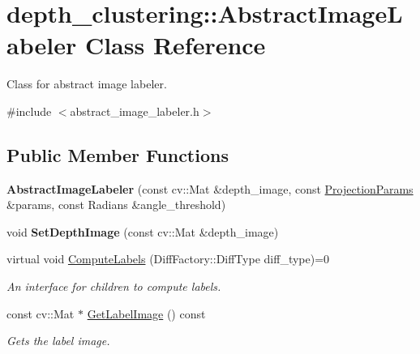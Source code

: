 \hypertarget{classdepth__clustering_1_1AbstractImageLabeler}{}\section{depth\+\_\+clustering\+:\+:Abstract\+Image\+Labeler Class Reference}
\label{classdepth__clustering_1_1AbstractImageLabeler}


Class for abstract image labeler.  




{\ttfamily \#include $<$abstract\+\_\+image\+\_\+labeler.\+h$>$}

\subsection*{Public Member Functions}
\begin{DoxyCompactItemize}
\item 
\mbox{\label{classdepth__clustering_1_1AbstractImageLabeler_ac01889e0a3d088cf7627809f4d8aab19}} 
{\bfseries Abstract\+Image\+Labeler} (const cv\+::\+Mat \&depth\+\_\+image, const \hyperlink{classdepth__clustering_1_1ProjectionParams}{Projection\+Params} \&params, const Radians \&angle\+\_\+threshold)
\item 
\mbox{\label{classdepth__clustering_1_1AbstractImageLabeler_a28e8e094c9a47a02a2ce9eabef9526e6}} 
void {\bfseries Set\+Depth\+Image} (const cv\+::\+Mat \&depth\+\_\+image)
\item 
\mbox{\label{classdepth__clustering_1_1AbstractImageLabeler_ac66f0554e1c988ab0bf413a2f17d3905}} 
virtual void \hyperlink{classdepth__clustering_1_1AbstractImageLabeler_ac66f0554e1c988ab0bf413a2f17d3905}{Compute\+Labels} (Diff\+Factory\+::\+Diff\+Type diff\+\_\+type)=0
\begin{DoxyCompactList}\small\item\em An interface for children to compute labels. \end{DoxyCompactList}\item 
const cv\+::\+Mat $\ast$ \hyperlink{classdepth__clustering_1_1AbstractImageLabeler_a7b2f8edf44f3ccb01fb71c296241615e}{Get\+Label\+Image} () const
\begin{DoxyCompactList}\small\item\em Gets the label image. \end{DoxyCompactList}\end{DoxyCompactItemize}
